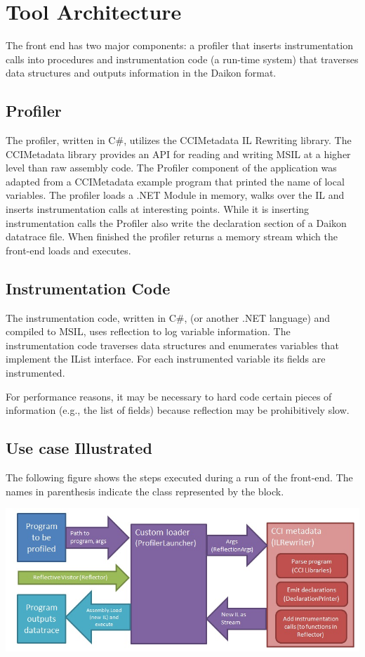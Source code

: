 \documentclass{article}
\begin{document}
\section{Tool Architecture}
The front end has two major components: a profiler that inserts instrumentation calls into procedures and instrumentation code (a run-time system) that traverses data structures and outputs information in the Daikon format.

\subsection{Profiler}
The profiler, written in C\#, utilizes the CCIMetadata IL Rewriting library. The CCIMetadata library provides an API for reading and writing MSIL at a higher level than raw assembly code. The Profiler component of the application was adapted from a CCIMetadata example program that printed the name of local variables. The profiler loads a .NET Module in memory, walks over the IL and inserts instrumentation calls at interesting points. While it is inserting instrumentation calls the Profiler also write the declaration section of a Daikon datatrace file. When finished the profiler returns a memory stream which the front-end loads and executes.

\subsection{Instrumentation Code}
The instrumentation code, written in C\#, (or another .NET language) and compiled to MSIL, uses reflection to log variable information. The instrumentation code traverses data structures and enumerates variables that implement the IList interface. For each instrumented variable its fields are instrumented.

For performance reasons, it may be necessary to hard code certain
pieces of information (e.g., the list of fields) because reflection
may be prohibitively slow.

\subsection{Use case Illustrated}
The following figure shows the steps executed during a run of the front-end. The names in parenthesis indicate the class represented by the block.

\includegraphics[scale=.7]{SequenceDiagram.jpg}
\end{document}

